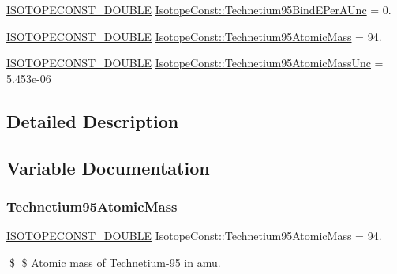 \begin{DoxyCompactItemize}
\mbox{\hyperlink{group___isotope_const-_macros_ga8f45a7272ce02c0b4c65c44636ed719a}{I\+S\+O\+T\+O\+P\+E\+C\+O\+N\+S\+T\+\_\+\+D\+O\+U\+B\+LE}} \mbox{\hyperlink{group___isotope_const-_technetium-_tc95_gaaab4c42a13389539a38529e7852f492e}{Isotope\+Const\+::\+Technetium95\+Bind\+E\+Per\+A\+Unc}} = 0.
\item 
\mbox{\hyperlink{group___isotope_const-_macros_ga8f45a7272ce02c0b4c65c44636ed719a}{I\+S\+O\+T\+O\+P\+E\+C\+O\+N\+S\+T\+\_\+\+D\+O\+U\+B\+LE}} \mbox{\hyperlink{group___isotope_const-_technetium-_tc95_ga6ce45f30888455f441d6cc5f5fb884c8}{Isotope\+Const\+::\+Technetium95\+Atomic\+Mass}} = 94.
\item 
\mbox{\hyperlink{group___isotope_const-_macros_ga8f45a7272ce02c0b4c65c44636ed719a}{I\+S\+O\+T\+O\+P\+E\+C\+O\+N\+S\+T\+\_\+\+D\+O\+U\+B\+LE}} \mbox{\hyperlink{group___isotope_const-_technetium-_tc95_ga8636750cf43cd12648ec416ff092b18c}{Isotope\+Const\+::\+Technetium95\+Atomic\+Mass\+Unc}} = 5.\+453e-\/06
\end{DoxyCompactItemize}


\subsection{Detailed Description}


\subsection{Variable Documentation}
\mbox{\label{group___isotope_const-_technetium-_tc95_ga6ce45f30888455f441d6cc5f5fb884c8}} 
\subsubsection{\texorpdfstring{Technetium95\+Atomic\+Mass}{Technetium95AtomicMass}}
{\footnotesize\ttfamily \mbox{\hyperlink{group___isotope_const-_macros_ga8f45a7272ce02c0b4c65c44636ed719a}{I\+S\+O\+T\+O\+P\+E\+C\+O\+N\+S\+T\+\_\+\+D\+O\+U\+B\+LE}} Isotope\+Const\+::\+Technetium95\+Atomic\+Mass = 94.}

\$ \$ Atomic mass of Technetium-\/95 in amu. \mbox{\label{group___isotope_const-_technetium-_tc95_ga8636750cf43cd12648ec416ff092b18c}} 
